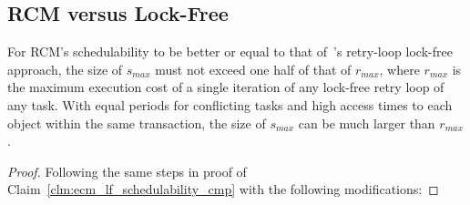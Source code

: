 \subsection{RCM versus Lock-Free}\label{subsec:rcm_vs_lf}
%
\begin{clm}
%
For RCM's schedulability to be better or equal to that of~\cite{key-5}'s retry-loop lock-free approach, the size of $s_{max}$ must not exceed one half of that of $r_{max}$, where $r_{max}$ is the maximum execution cost of a single iteration of any lock-free retry loop of any task. With equal periods for conflicting tasks and high access times to each object within the same transaction, the size of $s_{max}$ can be much larger than $r_{max}$.
%
\end{clm}
%
\begin{proof}\normalfont
%
Following the same steps in proof of Claim~\ref{clm:ecm_lf_schedulability_cmp} with the following modifications:


\end{proof}
